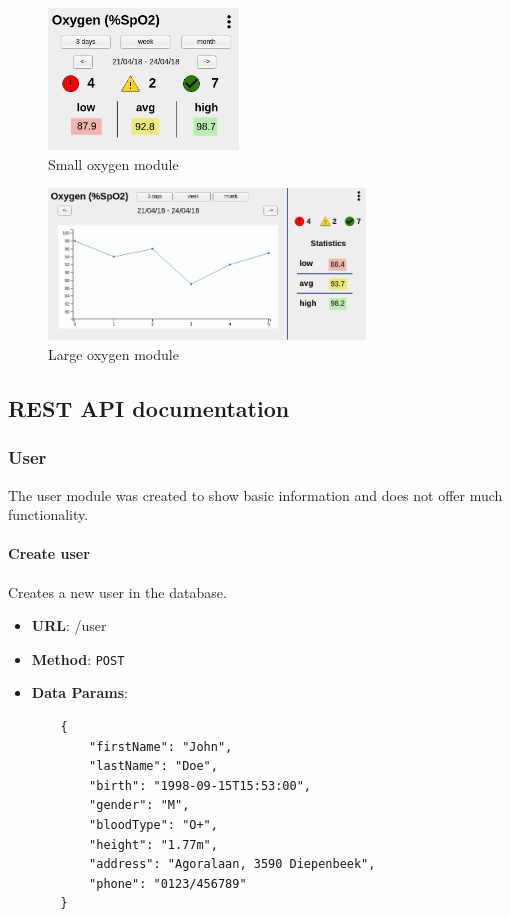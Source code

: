 \begin{figure}[!htb]
    \centering
    \includegraphics[width=0.45\textwidth]{chapters/3_design/mockups/oxygen_small}
    \caption{Small oxygen module}\label{fig:oxygen_small}
\end{figure}

\begin{figure}[!htb]
    \centering
    \includegraphics[width=0.75\textwidth]{chapters/3_design/mockups/oxygen_large}
    \caption{Large oxygen module}\label{fig:oxygen_large}
\end{figure}

\clearpage
\subsection{REST API documentation} \label{app_rest_api}

    \subsubsection{User}

        The user module was created to show basic information and does not offer much functionality.

        \paragraph{Create user} Creates a new user in the database.
        \begin{itemize}
            \item \textbf{URL}: /user
            \item \textbf{Method}: \texttt{POST}
            \item \textbf{Data Params}: \begin{verbatim}
    {
        "firstName": "John",
        "lastName": "Doe",
        "birth": "1998-09-15T15:53:00",
        "gender": "M",
        "bloodType": "O+",
        "height": "1.77m",
        "address": "Agoralaan, 3590 Diepenbeek",
        "phone": "0123/456789"
    }
            \end{verbatim}
        \end{itemize}

